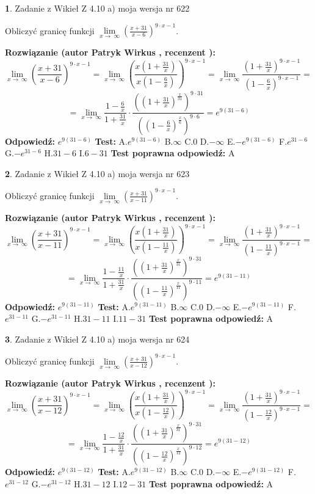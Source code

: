 \documentclass[12pt, a4paper]{article}
\theoremstyle{definition} %
\newtheorem{zad}{}
\newcommand{\zadStart}[1]{\begin{zad}#1\newline}
\newcommand{\zadStop}{\end{zad}}
\newcommand{\rozwStart}[2]{\noindent \textbf{Rozwiązanie (autor #1 , recenzent #2): }\newline}
\newcommand{\rozwStop}{\newline}
\newcommand{\odpStart}{\noindent \textbf{Odpowiedź:}\newline}
\newcommand{\odpStop}{\newline}
\newcommand{\testStart}{\noindent \textbf{Test:}\newline}
\newcommand{\testStop}{\newline}
\newcommand{\kluczStart}{\noindent \textbf{Test poprawna odpowiedź:}\newline}
\newcommand{\kluczStop}{\newline}
\begin{document}
\zadStart{Zadanie z Wikieł Z 4.10 a) moja wersja nr 622}


Obliczyć granicę funkcji  $\lim\limits_{x\to\ \infty}(\frac{x+31}{x-6})^{9\cdot x-1}$.
\zadStop
\rozwStart{Patryk Wirkus}{}
$$\lim\limits_{x\to\ \infty}(\frac{x+31}{x-6})^{9\cdot x-1} = \lim\limits_{x\to\ \infty}(\frac{x(1+\frac{31}{x})}{x(1-\frac{6}{x})})^{9\cdot x-1}=\lim\limits_{x\to\ \infty}\frac{(1+\frac{31}{x})^{9\cdot x-1}}{(1-\frac{6}{x})^{9\cdot x-1}}=$$
$$=\lim\limits_{x\to\ \infty}\frac{1-\frac{6}{x}}{1+\frac{31}{x}}\cdot\frac{((1+\frac{31}{x})^{\frac{x}{31}})^{9\cdot31}}{((1-\frac{6}{x})^{\frac{x}{6}})^{9\cdot6}}=e^{9(31-6)}$$
\rozwStop
\odpStart
$e^{9(31-6)}$
\odpStop
\testStart
A.$e^{9(31-6)}$ B.$\infty$ C.$0$ D.$-\infty$ E.$-e^{9(31-6)}$
F.$e^{31-6}$ G.$-e^{31-6}$
H.$31-6$
I.$6-31$
\testStop
\kluczStart
A
\kluczStop



\zadStart{Zadanie z Wikieł Z 4.10 a) moja wersja nr 623}


Obliczyć granicę funkcji  $\lim\limits_{x\to\ \infty}(\frac{x+31}{x-11})^{9\cdot x-1}$.
\zadStop
\rozwStart{Patryk Wirkus}{}
$$\lim\limits_{x\to\ \infty}(\frac{x+31}{x-11})^{9\cdot x-1} = \lim\limits_{x\to\ \infty}(\frac{x(1+\frac{31}{x})}{x(1-\frac{11}{x})})^{9\cdot x-1}=\lim\limits_{x\to\ \infty}\frac{(1+\frac{31}{x})^{9\cdot x-1}}{(1-\frac{11}{x})^{9\cdot x-1}}=$$
$$=\lim\limits_{x\to\ \infty}\frac{1-\frac{11}{x}}{1+\frac{31}{x}}\cdot\frac{((1+\frac{31}{x})^{\frac{x}{31}})^{9\cdot31}}{((1-\frac{11}{x})^{\frac{x}{11}})^{9\cdot11}}=e^{9(31-11)}$$
\rozwStop
\odpStart
$e^{9(31-11)}$
\odpStop
\testStart
A.$e^{9(31-11)}$ B.$\infty$ C.$0$ D.$-\infty$ E.$-e^{9(31-11)}$
F.$e^{31-11}$ G.$-e^{31-11}$
H.$31-11$
I.$11-31$
\testStop
\kluczStart
A
\kluczStop



\zadStart{Zadanie z Wikieł Z 4.10 a) moja wersja nr 624}


Obliczyć granicę funkcji  $\lim\limits_{x\to\ \infty}(\frac{x+31}{x-12})^{9\cdot x-1}$.
\zadStop
\rozwStart{Patryk Wirkus}{}
$$\lim\limits_{x\to\ \infty}(\frac{x+31}{x-12})^{9\cdot x-1} = \lim\limits_{x\to\ \infty}(\frac{x(1+\frac{31}{x})}{x(1-\frac{12}{x})})^{9\cdot x-1}=\lim\limits_{x\to\ \infty}\frac{(1+\frac{31}{x})^{9\cdot x-1}}{(1-\frac{12}{x})^{9\cdot x-1}}=$$
$$=\lim\limits_{x\to\ \infty}\frac{1-\frac{12}{x}}{1+\frac{31}{x}}\cdot\frac{((1+\frac{31}{x})^{\frac{x}{31}})^{9\cdot31}}{((1-\frac{12}{x})^{\frac{x}{12}})^{9\cdot12}}=e^{9(31-12)}$$
\rozwStop
\odpStart
$e^{9(31-12)}$
\odpStop
\testStart
A.$e^{9(31-12)}$ B.$\infty$ C.$0$ D.$-\infty$ E.$-e^{9(31-12)}$
F.$e^{31-12}$ G.$-e^{31-12}$
H.$31-12$
I.$12-31$
\testStop
\kluczStart
A
\kluczStop
\end{document}

